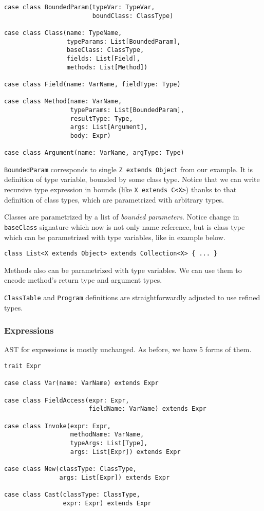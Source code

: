 \documentclass{article}[12pt]
\begin{document}
\begin{verbatim}
case class BoundedParam(typeVar: TypeVar,
                        boundClass: ClassType)

case class Class(name: TypeName,
                 typeParams: List[BoundedParam],
                 baseClass: ClassType,
                 fields: List[Field],
                 methods: List[Method])

case class Field(name: VarName, fieldType: Type)

case class Method(name: VarName,
                  typeParams: List[BoundedParam],
                  resultType: Type,
                  args: List[Argument],
                  body: Expr)
                  
case class Argument(name: VarName, argType: Type)
\end{verbatim}

\texttt{BoundedParam} corresponds to single
\texttt{Z extends Object} from our example. It is definition
of type variable, bounded by some class type. Notice that we
can write recursive type expression in bounds
(like \texttt{X extends C<X>}) thanks to that definition of class
types, which are parametrized with arbitrary types.

Classes are parametrized by a list of \emph{bounded parameters}.
Notice change in \texttt{baseClass} signature which now is not
only name reference, but is class type which can be parametrized
with type variables, like in example below.

\begin{verbatim}
class List<X extends Object> extends Collection<X> { ... }
\end{verbatim}

Methods also can be parametrized with type variables. We can use
them to encode method's return type and argument types.

\texttt{ClassTable} and \texttt{Program} definitions are
straightforwardly adjusted to use refined types.

\subsubsection{Expressions}

AST for expressions is mostly unchanged. As before, we have 5
forms of them.

\begin{verbatim}
trait Expr

case class Var(name: VarName) extends Expr

case class FieldAccess(expr: Expr,
                       fieldName: VarName) extends Expr

case class Invoke(expr: Expr,
                  methodName: VarName,
                  typeArgs: List[Type],
                  args: List[Expr]) extends Expr

case class New(classType: ClassType,
               args: List[Expr]) extends Expr

case class Cast(classType: ClassType,
                expr: Expr) extends Expr
\end{verbatim}
\end{document}
